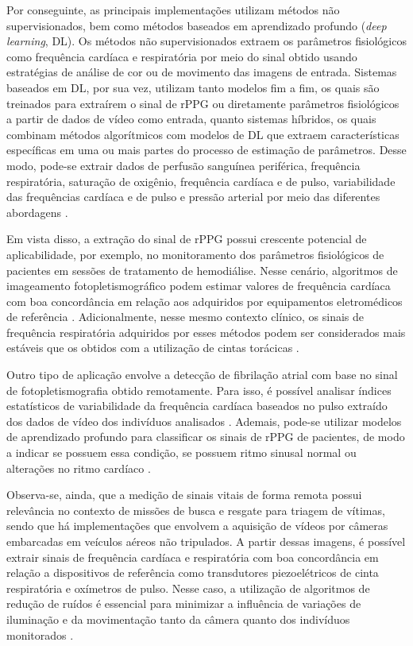 Por conseguinte, as principais implementações utilizam métodos não supervisionados, bem como métodos baseados em aprendizado profundo (\textit{deep learning}, DL). Os métodos não supervisionados extraem os parâmetros fisiológicos como frequência cardíaca e respiratória por meio do sinal obtido usando estratégias de análise de cor ou de movimento das imagens de entrada. Sistemas baseados em DL, por sua vez, utilizam tanto modelos fim a fim, os quais são treinados para extraírem o sinal de rPPG ou diretamente parâmetros fisiológicos a partir de dados de vídeo como entrada, quanto sistemas híbridos, os quais combinam métodos algorítmicos com modelos de DL que extraem características específicas em uma ou mais partes do processo de estimação de parâmetros. Desse modo, pode-se extrair dados de perfusão sanguínea periférica, frequência respiratória, saturação de oxigênio, frequência cardíaca e de pulso, variabilidade das frequências cardíaca e de pulso e pressão arterial por meio das diferentes abordagens \cite{chen2024deep}.
 
 Em vista disso, a extração do sinal de rPPG possui crescente potencial de aplicabilidade, por exemplo, no monitoramento dos parâmetros fisiológicos de pacientes em sessões de tratamento de hemodiálise. Nesse cenário, algoritmos de imageamento fotopletismográfico podem estimar valores de frequência cardíaca com boa concordância em relação aos adquiridos por equipamentos eletromédicos de referência \cite{villarroel2017non, villarroel2020non}. Adicionalmente, nesse mesmo contexto clínico, os sinais de frequência respiratória adquiridos por esses métodos podem ser considerados mais estáveis que os obtidos com a utilização de cintas torácicas \cite{tarassenko2014non}. 
 
 Outro tipo de aplicação envolve a detecção de fibrilação atrial com base no sinal de fotopletismografia obtido remotamente. Para isso, é possível analisar índices estatísticos de variabilidade da frequência cardíaca baseados no pulso extraído dos dados de vídeo dos indivíduos analisados \cite{couderc2015detection}. Ademais, pode-se utilizar modelos de aprendizado profundo para classificar os sinais de rPPG de pacientes, de modo a indicar se possuem essa condição, se possuem ritmo sinusal normal ou alterações no ritmo cardíaco \cite{sun2022contactless}.

Observa-se, ainda, que a medição de sinais vitais de forma remota possui relevância no contexto de missões de busca e resgate para triagem de vítimas, sendo que há implementações que envolvem a aquisição de vídeos por câmeras embarcadas em veículos aéreos não tripulados. A partir dessas imagens, é possível extrair sinais de frequência cardíaca e respiratória com boa concordância em relação a dispositivos de referência como transdutores piezoelétricos de cinta respiratória e oxímetros de pulso. Nesse caso, a utilização de algoritmos de redução de ruídos é essencial para minimizar a influência de variações de iluminação e da movimentação tanto da câmera quanto dos indivíduos monitorados \cite{al2017remote}.

